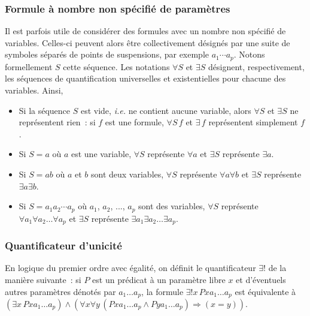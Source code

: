 \subsubsection{Formule à nombre non spécifié de paramètres}

Il est parfois utile de considérer des formules avec un nombre non spécifié de variables. 
Celles-ci peuvent alors être collectivement désignés par une suite de symboles séparés de points de suspensions, par exemple $a_1 \cdots a_p$. 
Notons formellement $S$ cette séquence.
Les notations $\forall S$ et $\exists S$ désignent, respectivement, les séquences de quantification universelles et existentielles pour chacune des variables. 
Ainsi, 
\begin{itemize}[nosep]
    \item Si la séquence $S$ est vide, \textit{i.e.} ne contient aucune variable, alors $\forall S$ et $\exists S$ ne représentent rien : si $f$ est une formule, $\forall S \, f$ et $\exists \, f$ représentent simplement $f$.
    \item Si $S = a$ où $a$ est une variable, $\forall S$ représente $\forall a$ et $\exists S$ représente $\exists a$. 
    \item Si $S = a b$ où $a$ et $b$ sont deux variables, $\forall S$ représente $\forall a \forall b$ et $\exists S$ représente $\exists a \exists b$. 
    \item Si $S = a_1 a_2 \cdots a_p$ où $a_1$, $a_2$, ..., $a_p$ sont des variables, $\forall S$ représente $\forall a_1 \forall a_2 \dots \forall a_p$ et $\exists S$ représente $\exists a_1 \exists a_2 \dots \exists a_p$. 
\end{itemize}

\subsubsection{Quantificateur d'unicité}

En logique du premier ordre avec égalité, on définit le quantificateur $\exists !$ de la manière suivante : si $P$ est un prédicat à un paramètre libre $x$ et d'éventuels autres paramètres dénotés par $a_1 \dots a_p$, la formule $\exists ! x \, P x a_1 \dots a_p$ est équivalente à $(\exists x \, P x a_1 \dots a_p) \wedge (\forall x \forall y \, (P x a_1 \dots a_p \wedge P y a_1 \dots a_p) \Rightarrow (x=y))$.
    
